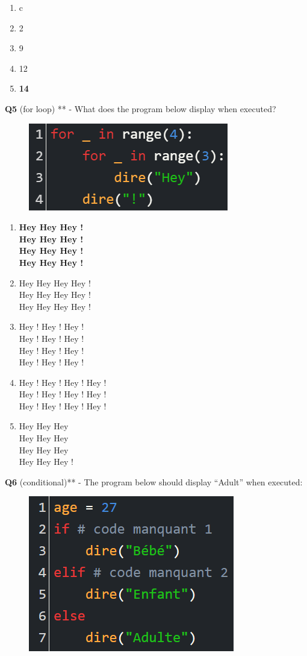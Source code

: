 \documentclass[14pt]{extarticle}
\begin{document}
\begin{enumerate}[label=\alph*)]
    \item c
    \item 2
    \item 9
    \item 12
    \item \textbf{14}
\end{enumerate}
\newpage
\textbf{Q5} (for loop) ** - What does the program below display when executed?
\begin{figure}[H]
    \centering
    \includegraphics[width=0.5\linewidth]{images/posttest/_Q5.png}
\end{figure}
\begin{enumerate}[label=\alph*)]
    \item \textbf{Hey Hey Hey ! \\
Hey Hey Hey ! \\
Hey Hey Hey ! \\
Hey Hey Hey !}

    \item Hey Hey Hey Hey ! \\
Hey Hey Hey Hey ! \\
Hey Hey Hey Hey !

    \item Hey ! Hey ! Hey ! \\
Hey ! Hey ! Hey ! \\
Hey ! Hey ! Hey ! \\
Hey ! Hey ! Hey !
 
    \item Hey ! Hey ! Hey ! Hey ! \\
Hey ! Hey ! Hey ! Hey ! \\
Hey ! Hey ! Hey ! Hey !

    \item Hey Hey Hey \\
Hey Hey Hey \\
Hey Hey Hey \\
Hey Hey Hey !

\end{enumerate}
\newpage
\textbf{Q6} (conditional)** - 
The program below should display “Adult” when executed:
\begin{figure}[H]
    \centering
    \includegraphics[width=0.5\linewidth]{images/posttest/_Q6.png}
\end{figure}
\end{document}
